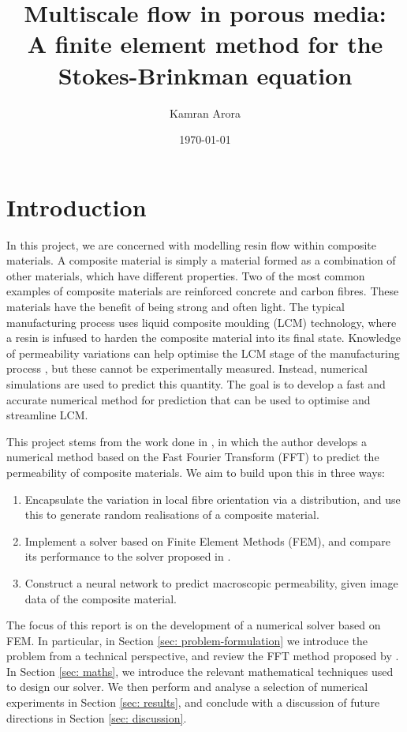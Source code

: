 \documentclass[12pt]{article}
\title{Multiscale flow in porous media: \\
\large A finite element method for the Stokes-Brinkman equation}
\author{Kamran Arora}
\date{\today}
\theoremstyle{theorem}
\begin{document}
\maketitle
\tableofcontents
\newpage
\section{Introduction}\label{sec: intro}

In this project, we are concerned with modelling resin flow within composite materials. A composite material is simply a material formed as a combination of other materials, which have different properties. Two of the most common examples of composite materials are reinforced concrete and carbon fibres. These materials have the benefit of being strong and often light. The typical manufacturing process uses liquid composite moulding (LCM) technology, where a resin is infused to harden the composite material into its final state. Knowledge of permeability variations can help optimise the LCM stage of the manufacturing process \cite{bodaghi2019}, but these cannot be experimentally measured. Instead, numerical simulations are used to predict this quantity. The goal is to develop a fast and accurate numerical method for prediction that can be used to optimise and streamline LCM.

This project stems from the work done in \cite{chen2023}, in which the author develops a numerical method based on the Fast Fourier Transform (FFT) to predict the permeability of composite materials. We aim to build upon this in three ways:

\begin{enumerate}
    \item Encapsulate the variation in local fibre orientation via a distribution, and use this to generate random realisations of a composite material.
    \item Implement a solver based on Finite Element Methods (FEM), and compare its performance to the solver proposed in \cite{chen2023}.
    \item Construct a neural network to predict macroscopic permeability, given image data of the composite material.
\end{enumerate}

The focus of this report is on the development of a numerical solver based on FEM. In particular, in Section \ref{sec: problem-formulation} we introduce the problem from a technical perspective, and review the FFT method proposed by \cite{chen2023}. In Section \ref{sec: maths}, we introduce the relevant mathematical techniques used to design our solver. We then perform and analyse a selection of numerical experiments in Section \ref{sec: results}, and conclude with a discussion of future directions in Section \ref{sec: discussion}.
\end{document}
